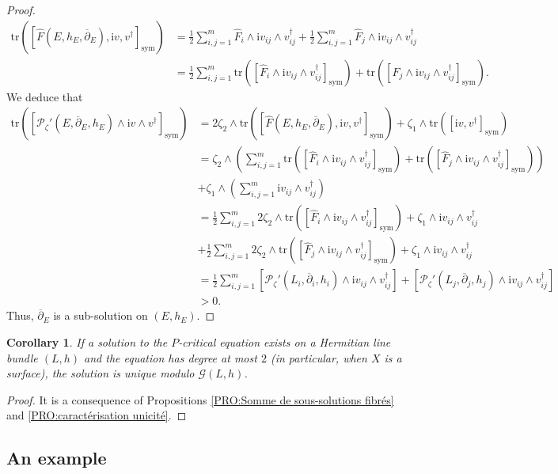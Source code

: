\documentclass{article}
\newtheorem{corollary}[theorem]{Corollary}
\theoremstyle{remark}
\theoremstyle{definition}
\newcommand{\tr}{\mathrm{tr}}
\renewcommand{\i}{\boldsymbol{\mathrm{i}}}
\newcommand{\G}{\mathcal{G}}
\newcommand{\mP}{\mathcal{P}}
\newcommand{\dbar}{\overline{\partial}}
\newcommand{\sym}{\mathrm{sym}}
\begin{document}
\begin{proof}
\begin{align*}
    \tr([\hat{F}(E,h_E,\dbar_E),\i v,v^\dagger]_\sym) & = \frac{1}{2}\sum_{i,j = 1}^m \hat{F}_i \wedge \i v_{ij} \wedge v_{ij}^\dagger + \frac{1}{2}\sum_{i,j = 1}^m \hat{F}_j \wedge \i v_{ij} \wedge v_{ij}^\dagger\\
    & = \frac{1}{2}\sum_{i,j = 1}^m \tr([\hat{F}_i \wedge \i v_{ij} \wedge v_{ij}^\dagger]_\sym) + \tr([\hat{F}_j \wedge \i v_{ij} \wedge v_{ij}^\dagger]_\sym).
\end{align*}
We deduce that
\begin{align*}
    \tr([\mP_\zeta'(E,\dbar_E,h_E) \wedge \i v \wedge v^\dagger]_\sym) & = 2\zeta_2 \wedge \tr([\hat{F}(E,h_E,\dbar_E),\i v,v^\dagger]_\sym) + \zeta_1 \wedge \tr([\i v,v^\dagger]_\sym)\\
    & = \zeta_2 \wedge \left(\sum_{i,j = 1}^m \tr([\hat{F}_i \wedge \i v_{ij} \wedge v_{ij}^\dagger]_\sym) + \tr([\hat{F}_j \wedge \i v_{ij} \wedge v_{ij}^\dagger]_\sym)\right)\\
    & + \zeta_1 \wedge \left(\sum_{i,j = 1}^m \i v_{ij} \wedge v_{ij}^\dagger\right)\\
    & = \frac{1}{2}\sum_{i,j = 1}^m 2\zeta_2 \wedge \tr([\hat{F}_i \wedge \i v_{ij} \wedge v_{ij}^\dagger]_\sym) + \zeta_1 \wedge \i v_{ij} \wedge v_{ij}^\dagger\\
    & + \frac{1}{2}\sum_{i,j = 1}^m 2\zeta_2 \wedge \tr([\hat{F}_j \wedge \i v_{ij} \wedge v_{ij}^\dagger]_\sym) + \zeta_1 \wedge \i v_{ij} \wedge v_{ij}^\dagger\\
    & = \frac{1}{2}\sum_{i,j = 1}^m [\mP_\zeta'(L_i,\dbar_i,h_i) \wedge \i v_{ij} \wedge v_{ij}^\dagger] + [\mP_\zeta'(L_j,\dbar_j,h_j) \wedge \i v_{ij} \wedge v_{ij}^\dagger]\\
    & > 0.
\end{align*}
Thus, $\dbar_E$ is a sub-solution on $(E,h_E)$.
\end{proof}

\begin{corollary}
    If a solution to the $P$-critical equation exists on a Hermitian line bundle $(L,h)$ and the equation has degree at most $2$ (in particular, when $X$ is a surface), the solution is unique modulo $\G(L,h)$.
\end{corollary}
\begin{proof}
It is a consequence of Propositions \ref{PRO:Somme de sous-solutions fibrés} and \ref{PRO:caractérisation unicité}.
\end{proof}

\subsection{An example}
\end{document}
